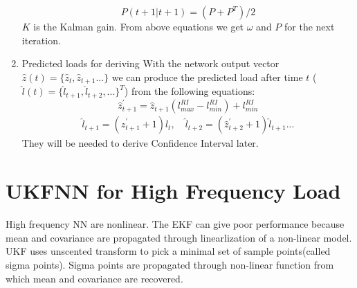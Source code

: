 \documentclass[letterpaper]{article}
\begin{document}
\begin{enumerate}
  \begin{equation}
    P(t+1|t+1) = (P+P^T)/2
  \end{equation}
    $K$ is the Kalman gain. From above equations we get $\omega$ and $P$ for the next iteration.

\item Predicted loads for deriving 
  With the network output vector $\hat{z}(t) = \{\hat{z}_t, \hat{z}_{t+1}...\}$ we can produce the predicted load after time $t$ ($\hat{l}(t) = \{\hat{l}_{t+1}, \hat{l}_{t+2}, ...\}^T$) from the following equations:
  \begin{equation}
    \hat{z}_{t+1}^\prime = \hat{z}_{t+1}(l_{max}^{RI}-l_{min}^{RI}) + l_{min}^{RI}
  \end{equation}
  \begin{align}
    \hat{l}_{t+1}=(\hat{z}_{t+1}^\prime+1)l_{t}, \quad \hat{l}_{t+2}=(\hat{z}_{t+2}^\prime+1)\hat{l}_{t+1}...
  \end{align}
  They will be needed to derive Confidence Interval later.
\end{enumerate}

\section*{UKFNN for High Frequency Load}
High frequency NN are nonlinear. The EKF can give poor performance because mean and covariance are propagated through linearlization of a non-linear model. UKF uses unscented transform to pick a minimal set of sample points(called sigma points). Sigma points are propagated through non-linear function from which mean and covariance are recovered.
\end{document}
